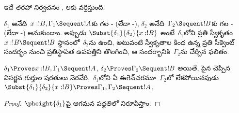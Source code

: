 \documentclass[../../../include/open-logic-section]{subfiles}
\begin{document}
ఇదే తరహా నిర్వచనం , లకు వర్తిస్తుంది.

\begin{defn}
$\delta_1$ అనేది~$x:!B, \Gamma_1 \Sequent !A$కు గల - (లేదా -), $\delta_2$ అనేది~$\Gamma_2 \Sequent !B$కు గల - (లేదా -) అనుకుందాం. అప్పుడు $\Subst{\delta_1}{\delta_2}{x:!B}$ అంటే~$\delta_1$లోని ప్రతి స్వీకృతం $x:!B \Sequent !B$ స్థానంలో~$\delta_2$ను ఉంచి, అటువంటి స్వీకృతాల కింద ఉన్న ప్రతి సీక్వెంట్ సందర్భం నుంచి ప్రతిస్థాపిత ఉపపత్తిని తొలగించి, ఆ సందర్భానికి~$\Gamma_2$ను చేర్చిన ఫలితం.
\end{defn}

\begin{prop}
$\delta_1 \Proves x:!B, \Gamma_1 \Sequent
!A$, $\delta_2 \Proves \Gamma_2 \Sequent !B$ అయితే, పైన చెప్పిన విసర్జన గుర్తుల షరతులు నెరవేరి,~$\delta_1$లోని ఏ ఈగెన్‌చరమూ~$\Gamma_2$లో లేకపోయినపుడు $\Subst{\delta_1}{\delta_2}{x:!B} \Proves \Gamma_1, \Gamma_2 \Sequent !A$.
\end{prop}

\begin{proof}
  $\pheight{\delta_1}$పై ఆగమన పద్ధతిలో నిరూపిస్తాం.
\end{proof}
\end{document}
